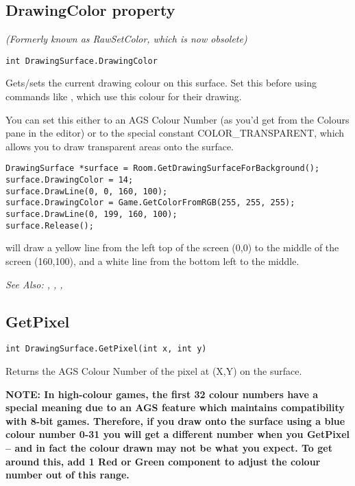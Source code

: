\subsection{DrawingColor property}\label{DrawingSurface.DrawingColor}%

\it{(Formerly known as RawSetColor, which is now obsolete)}

\begin{verbatim}
int DrawingSurface.DrawingColor
\end{verbatim}
Gets/sets the current drawing colour on this surface. Set this before using commands
like , which use this colour for
their drawing.

You can set this either to an AGS Colour Number (as you'd get from the Colours pane
in the editor) or to the special constant COLOR_TRANSPARENT, which allows you
to draw transparent areas onto the surface.

\begin{verbatim}
DrawingSurface *surface = Room.GetDrawingSurfaceForBackground();
surface.DrawingColor = 14;
surface.DrawLine(0, 0, 160, 100);
surface.DrawingColor = Game.GetColorFromRGB(255, 255, 255);
surface.DrawLine(0, 199, 160, 100);
surface.Release();
\end{verbatim}
will draw a yellow line from the left top of the screen (0,0) to the middle of the screen (160,100),
and a white line from the bottom left to the middle.

\it{See Also:} ,
,
,


\subsection{GetPixel}\label{DrawingSurface.GetPixel}%

\begin{verbatim}
int DrawingSurface.GetPixel(int x, int y)
\end{verbatim}
Returns the AGS Colour Number of the pixel at (X,Y) on the surface.

\bf{NOTE:} In high-colour games, the first 32 colour numbers have a special meaning
due to an AGS feature which maintains compatibility with 8-bit games. Therefore, if
you draw onto the surface using a blue colour number 0-31 you will get a different number
when you GetPixel -- and in fact the colour drawn may not be what you expect.
To get around this, add 1 Red or Green component to adjust the colour number out of this range.

